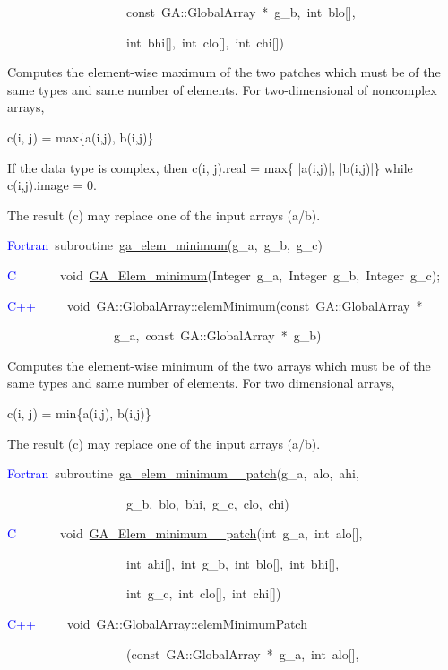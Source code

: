 ~~~~~~~~~~~~~~~~~~~const~GA::GlobalArray~{*}~g\_b,~int~blo{[}{]},~

~~~~~~~~~~~~~~~~~~~int~bhi{[}{]},~int~clo{[}{]},~int~chi{[}{]})

Computes the element-wise maximum of the two patches which must be
of the same types and same number of elements. For two-dimensional
of noncomplex arrays,

c(i, j) = max\{a(i,j), b(i,j)\}

If the data type is complex, then c(i, j).real = max\{ |a(i,j)|, |b(i,j)|\}
while c(i,j).image = 0.

The result (c) may replace one of the input arrays (a/b). 

\textcolor{blue}{Fortran}~subroutine~\href{https://hpc.pnl.gov/globalarrays/api/f_op_api.html\#ga_elem_minimum}{ga\_{}elem\_{}minimum}(g\_a,~g\_b,~g\_c)~

\textcolor{blue}{C}~~~~~~~void~\href{https://hpc.pnl.gov/globalarrays/api/c_op_api.html\#ga_elem_minimum}{GA\_{}Elem\_{}minimum}(Integer~g\_a,~Integer~g\_b,~Integer~g\_c);

\textcolor{blue}{C++~}~~~~void~GA::GlobalArray::elemMinimum(const~GA::GlobalArray~{*}

~~~~~~~~~~~~~~~~~g\_a,~const~GA::GlobalArray~{*}~g\_b)

Computes the element-wise minimum of the two arrays which must be
of the same types and same number of elements. For two dimensional
arrays,

c(i, j) = min\{a(i,j), b(i,j)\}

The result (c) may replace one of the input arrays (a/b). 

\textcolor{blue}{Fortran}~subroutine~\href{https://hpc.pnl.gov/globalarrays/api/f_op_api.html\#ga_elem_minimum_patch}{ga\_{}elem\_{}minimum\_{}\_{}patch}(g\_a,~alo,~ahi,

~~~~~~~~~~~~~~~~~~~g\_b,~blo,~bhi,~g\_c,~clo,~chi)~

\textcolor{blue}{C}~~~~~~~void~\href{https://hpc.pnl.gov/globalarrays/api/c_op_api.html\#ga_elem_minimum_patch}{GA\_{}Elem\_{}minimum\_{}\_{}patch}(int~g\_a,~int~alo{[}{]},~

~~~~~~~~~~~~~~~~~~~int~ahi{[}{]},~int~g\_b,~int~blo{[}{]},~int~bhi{[}{]},~

~~~~~~~~~~~~~~~~~~~int~g\_c,~int~clo{[}{]},~int~chi{[}{]})

\textcolor{blue}{C++}~~~~~void~GA::GlobalArray::elemMinimumPatch~~

~~~~~~~~~~~~~~~~~~~(const~GA::GlobalArray~{*}~g\_a,~int~alo{[}{]},~

